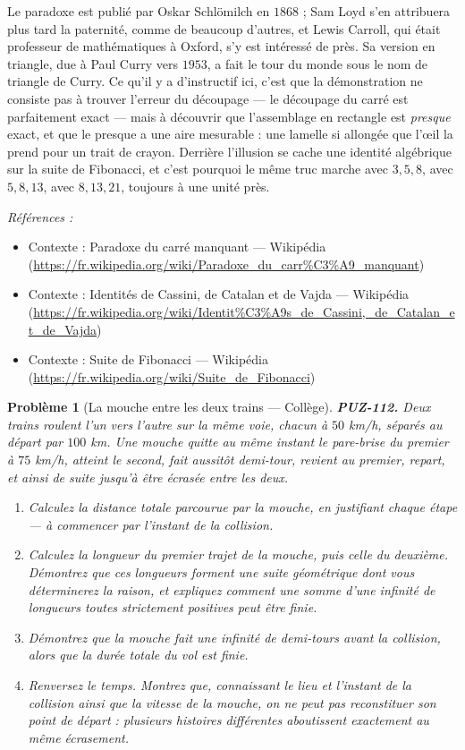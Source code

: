 \documentclass[11pt]{article}
\newtheorem{problem}{Problème}
\newenvironment{refs}{\par\small\noindent\emph{Références :}\begin{itemize}\setlength\itemsep{0pt}}{\end{itemize}\normalsize}
\begin{document}
\noindent Le paradoxe est publié par Oskar Schlömilch en $ 1868 $ ; Sam Loyd s'en
attribuera plus tard la paternité, comme de beaucoup d'autres, et Lewis Carroll, qui était
professeur de mathématiques à Oxford, s'y est intéressé de près. Sa version en triangle, due à
Paul Curry vers $ 1953 $, a fait le tour du monde sous le nom de triangle de Curry. Ce qu'il
y a d'instructif ici, c'est que la démonstration ne consiste pas à trouver l'erreur du
découpage --- le découpage du carré est parfaitement exact --- mais à découvrir que l'assemblage
en rectangle est \textit{presque} exact, et que le \og{} presque \fg{} a une aire mesurable : une
lamelle si allongée que l'\oe{}il la prend pour un trait de crayon. Derrière l'illusion se cache
une identité algébrique sur la suite de Fibonacci, et c'est pourquoi le même truc marche avec
$ 3, 5, 8 $, avec $ 5, 8, 13 $, avec $ 8, 13, 21 $, toujours à une unité près.

\begin{refs}
\item Contexte : Paradoxe du carré manquant --- Wikipédia (\url{https://fr.wikipedia.org/wiki/Paradoxe_du_carr%C3%A9_manquant})
\item Contexte : Identités de Cassini, de Catalan et de Vajda --- Wikipédia (\url{https://fr.wikipedia.org/wiki/Identit%C3%A9s_de_Cassini,_de_Catalan_et_de_Vajda})
\item Contexte : Suite de Fibonacci --- Wikipédia (\url{https://fr.wikipedia.org/wiki/Suite_de_Fibonacci})
\end{refs}

\bigskip

\begin{problem}[{La mouche entre les deux trains --- Collège}]
\textbf{PUZ-112.} Deux trains roulent l'un vers l'autre sur la même voie, chacun à
$ 50 $ km/h, séparés au départ par $ 100 $ km. Une mouche quitte au même instant le
pare-brise du premier à $ 75 $ km/h, atteint le second, fait aussitôt demi-tour, revient au
premier, repart, et ainsi de suite jusqu'à être écrasée entre les deux.
\begin{enumerate}
\item[(a)] Calculez la distance totale parcourue par la mouche, en justifiant chaque étape --- à
commencer par l'instant de la collision.
\item[(b)] Calculez la longueur du premier trajet de la mouche, puis celle du deuxième. Démontrez que
ces longueurs forment une suite géométrique dont vous déterminerez la raison, et expliquez
comment une somme d'une infinité de longueurs toutes strictement positives peut être
finie.
\item[(c)] Démontrez que la mouche fait une infinité de demi-tours avant la collision, alors que la
durée totale du vol est finie.
\item[(d)] Renversez le temps. Montrez que, connaissant le lieu et l'instant de la collision ainsi que
la vitesse de la mouche, on ne peut pas reconstituer son point de départ : plusieurs histoires
différentes aboutissent exactement au même écrasement.
\end{enumerate}

\end{problem}
\end{document}
